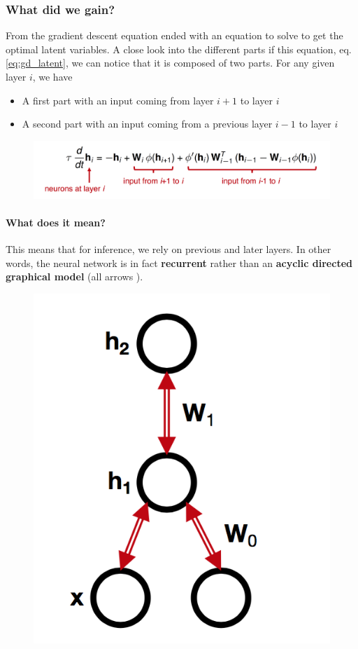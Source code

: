 \documentclass[main]{subfiles}
\begin{document}
\subsubsection{What did we gain?}
From the gradient descent equation ended with an equation to solve to get the optimal latent variables. A close look into the different parts if this equation, eq.\ref{eq:gd_latent}, we can notice that it is composed of two parts. For any given layer $i$, we have
\begin{itemize}
    \item A first part with an input coming from layer $i+1$ to layer $i$
    \item A second part with an input coming from a previous layer $i-1$ to layer $i$
\end{itemize}
\begin{figure}[H]
        \centering
        \includegraphics[width=0.9\linewidth]{06_PredictionErrorsDuringPerceptionAndLearning/figures/gd_equation.png}
        \label{fig:gd_equation_parts}
\end{figure}

\paragraph{What does it mean?} This means that for inference, we rely on previous and later layers. In other words, the neural network is in fact \textbf{recurrent} rather than an \textbf{acyclic directed graphical model} (all arrows ).

\begin{figure}[H]
        \centering
        \includegraphics[width=0.4\linewidth]{06_PredictionErrorsDuringPerceptionAndLearning/figures/inference_rnn.png}
\end{figure}
\end{document}
